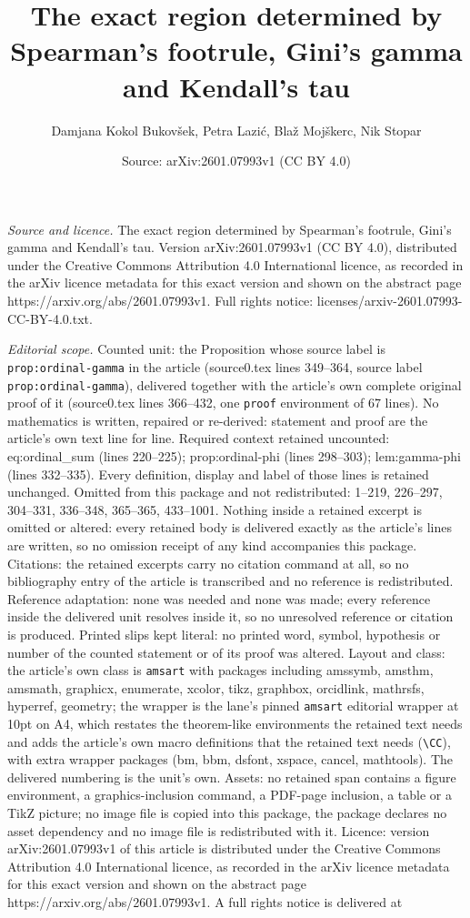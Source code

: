 \documentclass[10pt,a4paper]{amsart}
\title[The exact region determined by Spearman's footrule, Gini's g]{The exact region determined by Spearman's footrule, Gini's gamma and Kendall's tau}
\author{Damjana Kokol Bukov\v{s}ek, Petra Lazi\'c, Bla\v{z} Moj\v{s}kerc, Nik Stopar}
\date{Source: arXiv:2601.07993v1 (CC BY 4.0)}
\begin{document}
\maketitle

\noindent\emph{Source and licence.} The exact region determined by Spearman's footrule, Gini's gamma and Kendall's tau. Version arXiv:2601.07993v1 (CC BY 4.0), distributed under the Creative Commons Attribution 4.0 International licence, as recorded in the arXiv licence metadata for this exact version and shown on the abstract page https://arxiv.org/abs/2601.07993v1. Full rights notice: licenses/arxiv-2601.07993-CC-BY-4.0.txt.\par\smallskip

\noindent\textit{Editorial scope.} Counted unit: the Proposition whose source label is \texttt{prop:ordinal-gamma} in the article (source0.tex lines 349--364, source label \texttt{prop:ordinal-gamma}), delivered together with the article's own complete original proof of it (source0.tex lines 366--432, one \texttt{proof} environment of 67 lines). No mathematics is written, repaired or re-derived: statement and proof are the article's own text line for line. Required context retained uncounted: eq:ordinal\_sum (lines 220--225); prop:ordinal-phi (lines 298--303); lem:gamma-phi (lines 332--335). Every definition, display and label of those lines is retained unchanged. Omitted from this package and not redistributed: 1--219, 226--297, 304--331, 336--348, 365--365, 433--1001. Nothing inside a retained excerpt is omitted or altered: every retained body is delivered exactly as the article's lines are written, so no omission receipt of any kind accompanies this package. Citations: the retained excerpts carry no citation command at all, so no bibliography entry of the article is transcribed and no reference is redistributed. Reference adaptation: none was needed and none was made; every reference inside the delivered unit resolves inside it, so no unresolved reference or citation is produced. Printed slips kept literal: no printed word, symbol, hypothesis or number of the counted statement or of its proof was altered. Layout and class: the article's own class is \texttt{amsart} with packages including amssymb, amsthm, amsmath, graphicx, enumerate, xcolor, tikz, graphbox, orcidlink, mathrsfs, hyperref, geometry; the wrapper is the lane's pinned \texttt{amsart} editorial wrapper at 10pt on A4, which restates the theorem-like environments the retained text needs and adds the article's own macro definitions that the retained text needs (\texttt{\textbackslash CC}), with extra wrapper packages (bm, bbm, dsfont, xspace, cancel, mathtools). The delivered numbering is the unit's own. Assets: no retained span contains a figure environment, a graphics-inclusion command, a PDF-page inclusion, a table or a TikZ picture; no image file is copied into this package, the package declares no asset dependency and no image file is redistributed with it. Licence: version arXiv:2601.07993v1 of this article is distributed under the Creative Commons Attribution 4.0 International licence, as recorded in the arXiv licence metadata for this exact version and shown on the abstract page https://arxiv.org/abs/2601.07993v1. A full rights notice is delivered at 
\end{document}
